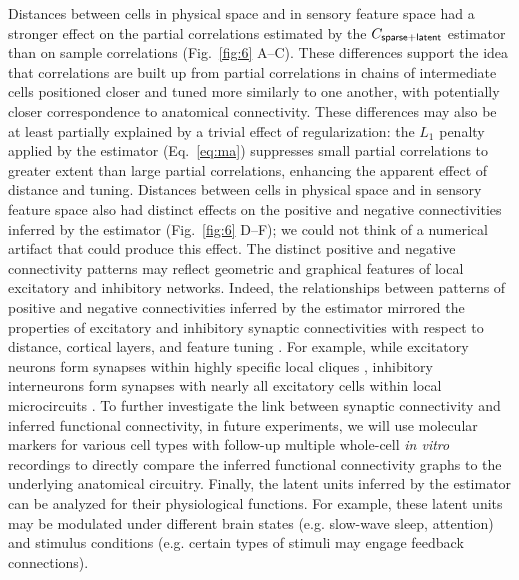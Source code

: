 Distances between cells in physical space and in sensory feature space had a stronger effect on the partial correlations estimated by the $C_{\sf sparse+latent}$ estimator than on sample correlations (Fig.~\ref{fig:6} A--C).
These differences support the idea that correlations are built up from partial correlations in chains of intermediate cells positioned closer and tuned more similarly to one another, with potentially closer correspondence to anatomical connectivity.  These differences may also be at least partially explained by a trivial effect of regularization: the $L_1$ penalty applied by the estimator (Eq.~\ref{eq:ma}) suppresses small partial correlations to greater extent than large partial correlations, enhancing the apparent effect of distance and tuning.  Distances between cells in physical space and in sensory feature space also had distinct effects on the positive and negative connectivities inferred by the estimator (Fig.~\ref{fig:6} D--F); we could not think of a numerical artifact that could produce this effect. The distinct positive and negative connectivity patterns  may reflect geometric and graphical features of local excitatory and inhibitory networks. Indeed, the relationships between patterns of positive and negative connectivities inferred by the estimator mirrored the properties of excitatory and inhibitory synaptic connectivities with respect to distance, cortical layers, and feature tuning \cite{Song:2005, Oswald:2008, Adesnik:2010, Perin:2011, Fino:2011, Hofer:2011, Isaacson:2011, Levy:2012}. For example, while excitatory neurons form synapses within highly specific local cliques \cite{Perin:2011}, inhibitory interneurons form synapses with nearly all excitatory cells within local microcircuits \cite{Fino:2011, Hofer:2011, Packer:2011}.  To further investigate the link between synaptic connectivity and inferred functional connectivity, in future experiments, we will use molecular markers for various cell types with follow-up multiple whole-cell \emph{in vitro} recordings \cite{Hofer:2011, Ko:2013} to directly compare the inferred functional connectivity graphs to the underlying anatomical circuitry. Finally, the latent units inferred by the estimator can be analyzed for their physiological functions. For example, these latent units may be modulated under different brain states (e.g. slow-wave sleep, attention) and stimulus conditions (e.g. certain types of stimuli may engage feedback connections).


